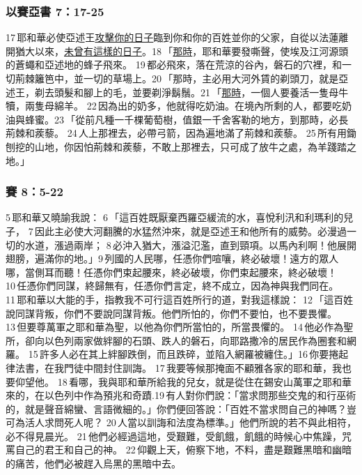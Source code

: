 \subsubsection{以賽亞書 7：17-25}
17 耶和華必使亞述王\underline{攻擊你的日子}臨到你和你的百姓並你的父家，自從以法蓮離開猶大以來，\underline{未曾有這樣的日子}。18 「\underline{那時}，耶和華要發嘶聲，使埃及江河源頭的蒼蠅和亞述地的蜂子飛來。 19 都必飛來，落在荒涼的谷內，磐石的穴裡，和一切荊棘籬笆中，並一切的草場上。20 「那時，主必用大河外賃的剃頭刀，就是亞述王，剃去頭髮和腳上的毛，並要剃淨鬍鬚。21 「\underline{那時}，一個人要養活一隻母牛犢，兩隻母綿羊。 22 因為出的奶多，他就得吃奶油。在境內所剩的人，都要吃奶油與蜂蜜。23 「從前凡種一千棵葡萄樹，值銀一千舍客勒的地方，到那時，必長荊棘和蒺藜。 24 人上那裡去，必帶弓箭，因為遍地滿了荊棘和蒺藜。 25 所有用鋤刨挖的山地，你因怕荊棘和蒺藜，不敢上那裡去，只可成了放牛之處，為羊踐踏之地。」

\subsubsection{賽 8：5-22}
5 耶和華又曉諭我說： 6 「這百姓既厭棄西羅亞緩流的水，喜悅利汛和利瑪利的兒子， 7 因此主必使大河翻騰的水猛然沖來，就是亞述王和他所有的威勢。必漫過一切的水道，漲過兩岸； 8 必沖入猶大，漲溢氾濫，直到頸項。以馬內利啊！他展開翅膀，遍滿你的地。」9 列國的人民哪，任憑你們喧嚷，終必破壞！遠方的眾人哪，當側耳而聽！任憑你們束起腰來，終必破壞，你們束起腰來，終必破壞！ 10 任憑你們同謀，終歸無有，任憑你們言定，終不成立，因為神與我們同在。 11 耶和華以大能的手，指教我不可行這百姓所行的道，對我這樣說： 12 「這百姓說同謀背叛，你們不要說同謀背叛。他們所怕的，你們不要怕，也不要畏懼。 13 但要尊萬軍之耶和華為聖，以他為你們所當怕的，所當畏懼的。 14 他必作為聖所，卻向以色列兩家做絆腳的石頭、跌人的磐石，向耶路撒冷的居民作為圈套和網羅。 15 許多人必在其上絆腳跌倒，而且跌碎，並陷入網羅被纏住。」16 你要捲起律法書，在我門徒中間封住訓誨。 17 我要等候那掩面不顧雅各家的耶和華，我也要仰望他。 18 看哪，我與耶和華所給我的兒女，就是從住在錫安山萬軍之耶和華來的，在以色列中作為預兆和奇蹟.19 有人對你們說：「當求問那些交鬼的和行巫術的，就是聲音綿蠻、言語微細的。」你們便回答說：「百姓不當求問自己的神嗎？豈可為活人求問死人呢？ 20 人當以訓誨和法度為標準。」他們所說的若不與此相符，必不得見晨光。 21 他們必經過這地，受艱難，受飢餓，飢餓的時候心中焦躁，咒罵自己的君王和自己的神。 22 仰觀上天，俯察下地，不料，盡是艱難黑暗和幽暗的痛苦，他們必被趕入烏黑的黑暗中去。



